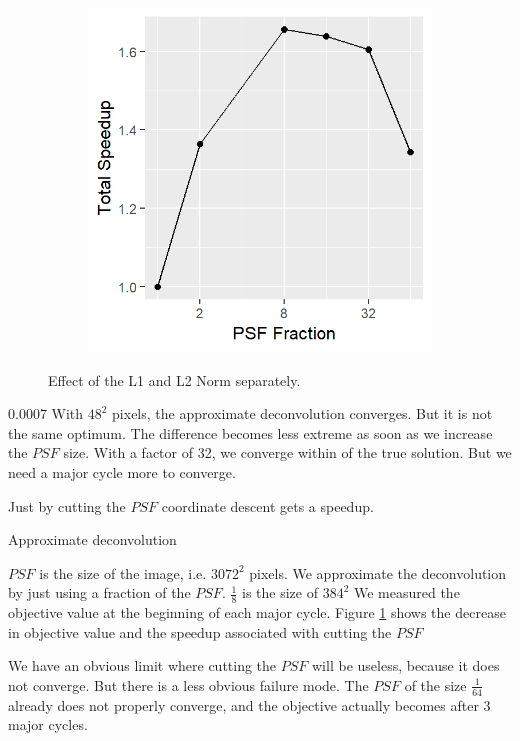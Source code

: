 \begin{figure}[h]
\begin{subfigure}[b]{0.35\linewidth}
		\includegraphics[width=\linewidth]{./chapters/10.results/gradient/ApproxDeconv/speedup_total.png}
	\end{subfigure}
	
	\caption{Effect of the L1 and L2 Norm separately.}
	\label{results:gradients:aproxDeconv}
\end{figure}
0.0007
With $48^2$ pixels, the approximate deconvolution converges. But it is not the same optimum. The difference becomes less extreme as soon as we increase the $PSF$ size. With a factor of 32, we converge within
of the true solution. But we need a major cycle more to converge.




Just by cutting the $PSF$ coordinate descent gets a speedup. 


Approximate deconvolution

$PSF$ is the size of the image, i.e. $3072^2$ pixels. We approximate the deconvolution by just using a fraction of the $PSF$. $\frac{1}{8}$ is the size of $384^2$
We measured the objective value at the beginning of each major cycle.
Figure \ref{results:gradients:aproxDeconv} shows the decrease in objective value
and the speedup associated with cutting the $PSF$

We have an obvious limit where cutting the $PSF$ will be useless, because it does not converge.
But there is a less obvious failure mode. The $PSF$ of the size $\frac{1}{64}$ already does not properly converge, and the objective actually becomes after 3 major cycles.

